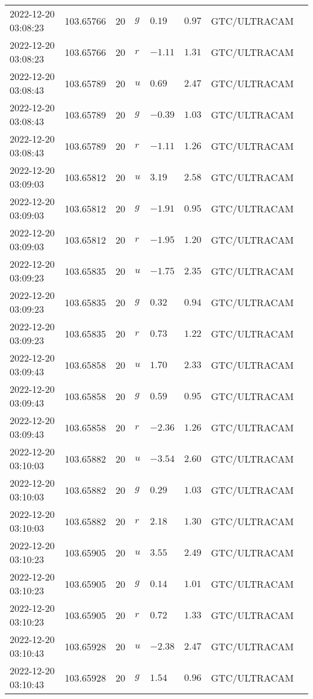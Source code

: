 \documentclass{nature_plusfigure}
\begin{document}
\begin{supplement}
\begin{center}
\begin{longtable}{llllllll}
2022-12-20 03:08:23 & 103.65766 & 20 & $g$ & $0.19$ & $0.97$ & GTC/ULTRACAM &  \\ 
2022-12-20 03:08:23 & 103.65766 & 20 & $r$ & $-1.11$ & $1.31$ & GTC/ULTRACAM &  \\ 
2022-12-20 03:08:43 & 103.65789 & 20 & $u$ & $0.69$ & $2.47$ & GTC/ULTRACAM &  \\ 
2022-12-20 03:08:43 & 103.65789 & 20 & $g$ & $-0.39$ & $1.03$ & GTC/ULTRACAM &  \\ 
2022-12-20 03:08:43 & 103.65789 & 20 & $r$ & $-1.11$ & $1.26$ & GTC/ULTRACAM &  \\ 
2022-12-20 03:09:03 & 103.65812 & 20 & $u$ & $3.19$ & $2.58$ & GTC/ULTRACAM &  \\ 
2022-12-20 03:09:03 & 103.65812 & 20 & $g$ & $-1.91$ & $0.95$ & GTC/ULTRACAM &  \\ 
2022-12-20 03:09:03 & 103.65812 & 20 & $r$ & $-1.95$ & $1.20$ & GTC/ULTRACAM &  \\ 
2022-12-20 03:09:23 & 103.65835 & 20 & $u$ & $-1.75$ & $2.35$ & GTC/ULTRACAM &  \\ 
2022-12-20 03:09:23 & 103.65835 & 20 & $g$ & $0.32$ & $0.94$ & GTC/ULTRACAM &  \\ 
2022-12-20 03:09:23 & 103.65835 & 20 & $r$ & $0.73$ & $1.22$ & GTC/ULTRACAM &  \\ 
2022-12-20 03:09:43 & 103.65858 & 20 & $u$ & $1.70$ & $2.33$ & GTC/ULTRACAM &  \\ 
2022-12-20 03:09:43 & 103.65858 & 20 & $g$ & $0.59$ & $0.95$ & GTC/ULTRACAM &  \\ 
2022-12-20 03:09:43 & 103.65858 & 20 & $r$ & $-2.36$ & $1.26$ & GTC/ULTRACAM &  \\ 
2022-12-20 03:10:03 & 103.65882 & 20 & $u$ & $-3.54$ & $2.60$ & GTC/ULTRACAM &  \\ 
2022-12-20 03:10:03 & 103.65882 & 20 & $g$ & $0.29$ & $1.03$ & GTC/ULTRACAM &  \\ 
2022-12-20 03:10:03 & 103.65882 & 20 & $r$ & $2.18$ & $1.30$ & GTC/ULTRACAM &  \\ 
2022-12-20 03:10:23 & 103.65905 & 20 & $u$ & $3.55$ & $2.49$ & GTC/ULTRACAM &  \\ 
2022-12-20 03:10:23 & 103.65905 & 20 & $g$ & $0.14$ & $1.01$ & GTC/ULTRACAM &  \\ 
2022-12-20 03:10:23 & 103.65905 & 20 & $r$ & $0.72$ & $1.33$ & GTC/ULTRACAM &  \\ 
2022-12-20 03:10:43 & 103.65928 & 20 & $u$ & $-2.38$ & $2.47$ & GTC/ULTRACAM &  \\ 
2022-12-20 03:10:43 & 103.65928 & 20 & $g$ & $1.54$ & $0.96$ & GTC/ULTRACAM &  \\ 

\end{longtable}
\end{center}
\end{supplement}
\end{document}
